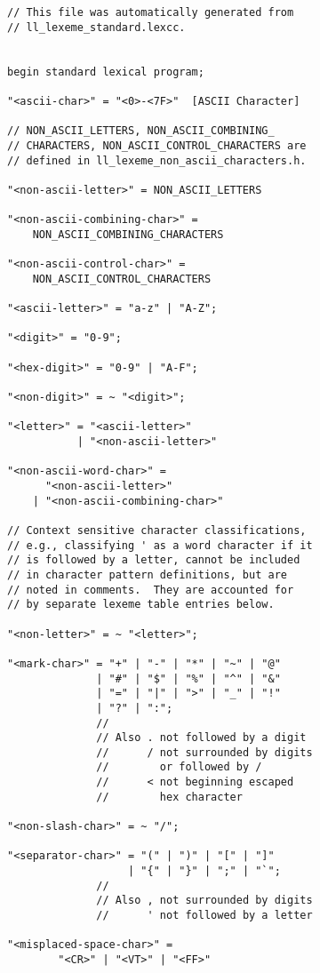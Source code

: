 \documentclass[12pt]{article}
\newenvironment{indpar}[1][0.3in]%
	{\begin{list}{}%
		     {\setlength{\itemsep}{0in}%
		      \setlength{\topsep}{0in}%
		      \setlength{\parsep}{1ex}%
		      \setlength{\labelwidth}{#1}%
		      \setlength{\leftmargin}{#1}%
		      \addtolength{\leftmargin}{\labelsep}}%
	 \item}%
	{\end{list}}
\begin{document}
\begin{indpar}
\begin{verbatim}
// This file was automatically generated from
// ll_lexeme_standard.lexcc.


begin standard lexical program;

"<ascii-char>" = "<0>-<7F>"  [ASCII Character]

// NON_ASCII_LETTERS, NON_ASCII_COMBINING_
// CHARACTERS, NON_ASCII_CONTROL_CHARACTERS are
// defined in ll_lexeme_non_ascii_characters.h.

"<non-ascii-letter>" = NON_ASCII_LETTERS

"<non-ascii-combining-char>" =
    NON_ASCII_COMBINING_CHARACTERS

"<non-ascii-control-char>" =
    NON_ASCII_CONTROL_CHARACTERS

"<ascii-letter>" = "a-z" | "A-Z";

"<digit>" = "0-9";

"<hex-digit>" = "0-9" | "A-F";

"<non-digit>" = ~ "<digit>";

"<letter>" = "<ascii-letter>"
           | "<non-ascii-letter>"

"<non-ascii-word-char>" =
      "<non-ascii-letter>"
    | "<non-ascii-combining-char>"

// Context sensitive character classifications,
// e.g., classifying ' as a word character if it
// is followed by a letter, cannot be included
// in character pattern definitions, but are
// noted in comments.  They are accounted for
// by separate lexeme table entries below.

"<non-letter>" = ~ "<letter>";

"<mark-char>" = "+" | "-" | "*" | "~" | "@"
              | "#" | "$" | "%" | "^" | "&"
              | "=" | "|" | ">" | "_" | "!"
              | "?" | ":";
              //
              // Also . not followed by a digit
              //      / not surrounded by digits
              //        or followed by /
              //      < not beginning escaped
              //        hex character

"<non-slash-char>" = ~ "/";

"<separator-char>" = "(" | ")" | "[" | "]"
                   | "{" | "}" | ";" | "`";
              //
              // Also , not surrounded by digits
              //      ' not followed by a letter

"<misplaced-space-char>" =
        "<CR>" | "<VT>" | "<FF>"


\end{verbatim}
\end{indpar}
\end{document}
